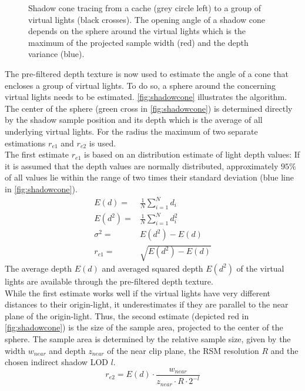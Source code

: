 \documentclass[thesis.tex]{subfiles}
\begin{document}
\begin{figure}[h]
	\centering
	\caption{Shadow cone tracing from a cache (grey circle left) to a group of virtual lights (black crosses). The opening angle of a shadow cone depends on the sphere around the virtual lights which is the maximum of the projected sample width (red) and the depth variance (blue).} \label{fig:shadowcone}
\end{figure}
The pre-filtered depth texture is now used to estimate the angle of a cone that encloses a group of virtual lights.
To do so, a sphere around the concerning virtual lights needs to be estimated.
\autoref{fig:shadowcone} illustrates the algorithm.
The center of the sphere (green cross in \autoref{fig:shadowcone}) is determined directly by the shadow sample position and its depth which is the average of all underlying virtual lights.
For the radius the maximum of two separate estimations $r_{e1}$ and $r_{e2}$ is used.
\\
The first estimate $r_{e1}$ is based on an distribution estimate of light depth values:
If it is assumed that the depth values are normally distributed, approximately $95\%$ of all values lie within the range of two times their standard deviation (blue line in \autoref{fig:shadowcone}).
\begin{align}
E(d) =& \frac{1}{N} \sum\limits_{i=1}^{N} d_i\\
E(d^2) =& \frac{1}{N} \sum\limits_{i=1}^{N} d_i^2\\
\sigma^2 =& E(d^2) - E(d)\\
r_{e1} =& \sqrt{E(d^2) - E(d)}
\end{align}
The average depth $E(d)$ and averaged squared depth $E(d^2)$ of the virtual lights are available through the pre-filtered depth texture.
\\
While the first estimate works well if the virtual lights have very different distances to their origin-light, it underestimates if they are parallel to the near plane of the origin-light.
Thus, the second estimate (depicted red in \autoref{fig:shadowcone}) is the size of the sample area, projected to the center of the sphere.
The sample area is determined by the relative sample size, given by the width $w_{near}$ and depth $z_{near}$ of the near clip plane, the RSM resolution $R$ and the chosen indirect shadow LOD $l$.
\begin{equation}
r_{e2} = E(d) \cdot \frac{w_{near}}{z_{near} \cdot R \cdot 2^{-l} }
\end{equation}
\end{document}
